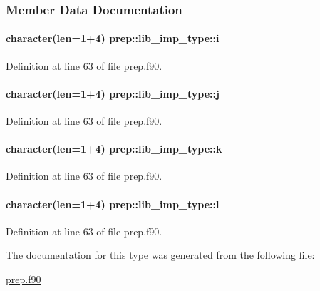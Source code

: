 \subsubsection{Member Data Documentation}
\hypertarget{structprep_1_1lib__imp__type_ab715321e4b7a49dea3499cbb88309e7c}{
\paragraph[{i}]{\setlength{\rightskip}{0pt plus 5cm}character(len=1+4) prep\-::lib\-\_\-imp\-\_\-type\-::i}}\label{structprep_1_1lib__imp__type_ab715321e4b7a49dea3499cbb88309e7c}


Definition at line 63 of file prep.\-f90.

\hypertarget{structprep_1_1lib__imp__type_a9ce08aa65e4adf5ee7b0e3cd9e282118}{
\paragraph[{j}]{\setlength{\rightskip}{0pt plus 5cm}character(len=1+4) prep\-::lib\-\_\-imp\-\_\-type\-::j}}\label{structprep_1_1lib__imp__type_a9ce08aa65e4adf5ee7b0e3cd9e282118}


Definition at line 63 of file prep.\-f90.

\hypertarget{structprep_1_1lib__imp__type_af4dbcd696da7d0c3fff40a717ee2d715}{
\paragraph[{k}]{\setlength{\rightskip}{0pt plus 5cm}character(len=1+4) prep\-::lib\-\_\-imp\-\_\-type\-::k}}\label{structprep_1_1lib__imp__type_af4dbcd696da7d0c3fff40a717ee2d715}


Definition at line 63 of file prep.\-f90.

\hypertarget{structprep_1_1lib__imp__type_ae695028b663d39353cd9f7d9d3c286c1}{
\paragraph[{l}]{\setlength{\rightskip}{0pt plus 5cm}character(len=1+4) prep\-::lib\-\_\-imp\-\_\-type\-::l}}\label{structprep_1_1lib__imp__type_ae695028b663d39353cd9f7d9d3c286c1}


Definition at line 63 of file prep.\-f90.



The documentation for this type was generated from the following file\-:\begin{DoxyCompactItemize}
\item 
\hyperlink{prep_8f90}{prep.\-f90}\end{DoxyCompactItemize}
